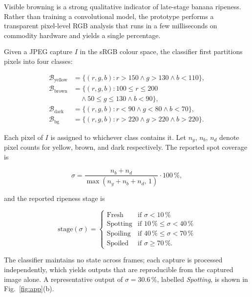 Visible browning is a strong qualitative indicator of late-stage
banana ripeness. Rather than training a convolutional model, the
prototype performs a transparent pixel-level RGB analysis that runs
in a few milliseconds on commodity hardware and yields a single
percentage.

Given a JPEG capture $I$ in the sRGB colour space, the classifier
first partitions pixels into four classes:

\begin{align*}
\mathcal{B}_{\text{yellow}} &= \{(r, g, b) : r > 150 \land g > 130 \land b < 110\}, \\
\mathcal{B}_{\text{brown}}  &= \{(r, g, b) : 100 \leq r \leq 200 \\
                            & \quad \land 50 \leq g \leq 130 \land b < 90\}, \\
\mathcal{B}_{\text{dark}}   &= \{(r, g, b) : r < 90 \land g < 80 \land b < 70\}, \\
\mathcal{B}_{\text{bg}}     &= \{(r, g, b) : r > 220 \land g > 220 \land b > 220\}.
\end{align*}

Each pixel of $I$ is assigned to whichever class contains it. Let
$n_y$, $n_b$, $n_d$ denote pixel counts for yellow, brown, and dark
respectively. The reported spot coverage is

\begin{equation}
\sigma = \frac{n_b + n_d}{\max(n_y + n_b + n_d, \, 1)} \cdot 100\,\%,
\label{eq:sigma}
\end{equation}

and the reported ripeness stage is

\begin{equation}
\text{stage}(\sigma) =
\begin{cases}
\text{Fresh}     & \text{if } \sigma <  10\,\% \\
\text{Spotting}  & \text{if } 10\,\% \leq \sigma < 40\,\% \\
\text{Spoiling}  & \text{if } 40\,\% \leq \sigma < 70\,\% \\
\text{Spoiled}   & \text{if } \sigma \geq 70\,\%.
\end{cases}
\label{eq:stage}
\end{equation}

The classifier maintains no state across frames; each capture is
processed independently, which yields outputs that are reproducible
from the captured image alone. A representative output of
$\sigma = 30.6\,\%$, labelled \emph{Spotting}, is shown in
Fig.~\ref{fig:app}(b).

